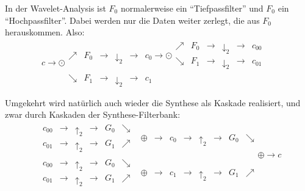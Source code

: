 In der Wavelet-Analysis ist $ F_{0} $ normalerweise ein \enquote{Tiefpassfilter} und $ F_{0} $ ein 
\enquote{Hochpassfilter}. Dabei werden nur die Daten weiter zerlegt, die aus $ F_{0} $ herauskommen.
Also:
\[
  c \rightarrow \odot
  \begin{array}{*{7}{l}}
    \nearrow & \boxed{F_{0}} & \rightarrow & \boxed{\downarrow_{2}} & \rightarrow & 
      c_{0} \rightarrow \odot
      \begin{array}{*{6}{c}}
        \nearrow & \boxed{F_{0}} & \rightarrow & \boxed{\downarrow_{2}} & \rightarrow & c_{00}
          \\[0.5em]
        \searrow & \boxed{F_{1}} & \rightarrow & \boxed{\downarrow_{2}} & \rightarrow & c_{01}
      \end{array} \\
    \searrow & \boxed{F_{1}} & \rightarrow & \boxed{\downarrow_{2}} & \rightarrow & c_{1} &
  \end{array}
\]

Umgekehrt wird natürlich auch wieder die Synthese als Kaskade realisiert, und zwar durch Kaskaden
der Synthese-Filterbank:
\[
  \begin{array}{*{9}{c}}
    \begin{array}{*{6}{c}}
      c_{00} & \rightarrow & \boxed{\uparrow_{2}} & \rightarrow & \boxed{G_{0}} & \searrow \\[0.5em]
      c_{01} & \rightarrow & \boxed{\uparrow_{2}} & \rightarrow & \boxed{G_{1}} & \nearrow 
    \end{array} 
      & \oplus & \rightarrow & c_{0} & \rightarrow & \boxed{\uparrow_{2}} & \rightarrow 
      & \boxed{G_{0}} & \searrow
      \\[1.5em]
    \begin{array}{*{6}{c}}
      c_{00} & \rightarrow & \boxed{\uparrow_{2}} & \rightarrow & \boxed{G_{0}} & \searrow \\[0.5em]
      c_{01} & \rightarrow & \boxed{\uparrow_{2}} & \rightarrow & \boxed{G_{1}} & \nearrow 
    \end{array}
      & \oplus & \rightarrow & c_{1} & \rightarrow & \boxed{\uparrow_{2}} & \rightarrow 
      & \boxed{G_{1}} & \nearrow
  \end{array}
  \oplus \rightarrow c
\]